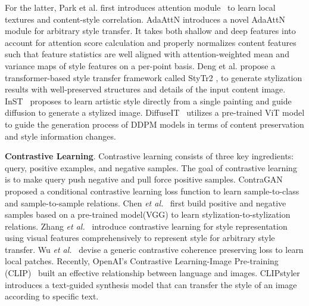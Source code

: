 \documentclass[times,twocolumn,final,authoryear]{elsarticle}
\begin{document}
For the latter, Park et al. first introduces attention module~\cite {park2019arbitrary} to learn local textures and content-style correlation. AdaAttN introduces a novel AdaAttN module for arbitrary
style transfer. It takes both shallow and deep features
into account for attention score calculation and properly normalizes content features such that feature statistics are well aligned with attention-weighted mean and
variance maps of style features on a per-point basis. Deng et al. propose a transformer-based style transfer framework called
StyTr2
, to generate stylization results with well-preserved
structures and details of the input content image.
InST~\citep{zhang2023inversion} proposes to learn artistic style directly from a single painting and guide diffusion to generate a stylized image. DiffuseIT~\citep{kwon2022diffusion} utilizes a pre-trained ViT model to guide
the generation process of DDPM models in terms of content preservation and style information changes.

\textbf{Contrastive Learning}. Contrastive learning consists of three key ingredients: query, positive examples, and negative samples. The goal of contrastive learning is to make query push negative and pull force positive samples. ContraGAN proposed a conditional contrastive learning loss function to learn sample-to-class and sample-to-sample relations. Chen \emph{et al.}~\citep{chen2021artistic} first build positive and negative samples based on a pre-trained model(VGG) to learn stylization-to-stylization relations. Zhang \emph{et al.}~\citep{zhang2022domain} introduce contrastive learning for style representation using visual features comprehensively to represent style for arbitrary style transfer. Wu \emph{et al.}~\citep{wu2022ccpl} devise a generic contrastive coherence preserving loss to learn local patches. Recently, OpenAI's Contrastive Learning-Image Pre-training (CLIP)~\citep{radford2021learning} built an effective relationship between language and images. CLIPstyler~\citep{kwon2022clipstyler} introduces a text-guided synthesis model that can transfer the style of an image according to specific text.
\end{document}
